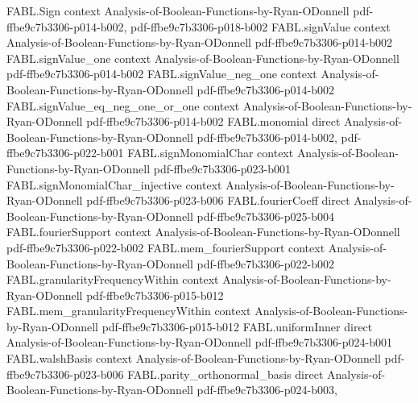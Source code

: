 \begin{theorem}
\label{FABL.bentkusWhitening_norm_sameSigns_le}
\leanok
{}
\proofstep
  {FABL.Sign}
  {context}
  {Analysis-of-Boolean-Functions-by-Ryan-ODonnell}
  {pdf-ffbe9c7b3306-p014-b002,
    pdf-ffbe9c7b3306-p018-b002}
\proofstep
  {FABL.signValue}
  {context}
  {Analysis-of-Boolean-Functions-by-Ryan-ODonnell}
  {pdf-ffbe9c7b3306-p014-b002}
\proofstep
  {FABL.signValue_one}
  {context}
  {Analysis-of-Boolean-Functions-by-Ryan-ODonnell}
  {pdf-ffbe9c7b3306-p014-b002}
\proofstep
  {FABL.signValue_neg_one}
  {context}
  {Analysis-of-Boolean-Functions-by-Ryan-ODonnell}
  {pdf-ffbe9c7b3306-p014-b002}
\proofstep
  {FABL.signValue_eq_neg_one_or_one}
  {context}
  {Analysis-of-Boolean-Functions-by-Ryan-ODonnell}
  {pdf-ffbe9c7b3306-p014-b002}
\proofstep
  {FABL.monomial}
  {direct}
  {Analysis-of-Boolean-Functions-by-Ryan-ODonnell}
  {pdf-ffbe9c7b3306-p014-b002,
    pdf-ffbe9c7b3306-p022-b001}
\proofstep
  {FABL.signMonomialChar}
  {context}
  {Analysis-of-Boolean-Functions-by-Ryan-ODonnell}
  {pdf-ffbe9c7b3306-p023-b001}
\proofstep
  {FABL.signMonomialChar_injective}
  {context}
  {Analysis-of-Boolean-Functions-by-Ryan-ODonnell}
  {pdf-ffbe9c7b3306-p023-b006}
\proofstep
  {FABL.fourierCoeff}
  {direct}
  {Analysis-of-Boolean-Functions-by-Ryan-ODonnell}
  {pdf-ffbe9c7b3306-p025-b004}
\proofstep
  {FABL.fourierSupport}
  {context}
  {Analysis-of-Boolean-Functions-by-Ryan-ODonnell}
  {pdf-ffbe9c7b3306-p022-b002}
\proofstep
  {FABL.mem_fourierSupport}
  {context}
  {Analysis-of-Boolean-Functions-by-Ryan-ODonnell}
  {pdf-ffbe9c7b3306-p022-b002}
\proofstep
  {FABL.granularityFrequencyWithin}
  {context}
  {Analysis-of-Boolean-Functions-by-Ryan-ODonnell}
  {pdf-ffbe9c7b3306-p015-b012}
\proofstep
  {FABL.mem_granularityFrequencyWithin}
  {context}
  {Analysis-of-Boolean-Functions-by-Ryan-ODonnell}
  {pdf-ffbe9c7b3306-p015-b012}
\proofstep
  {FABL.uniformInner}
  {direct}
  {Analysis-of-Boolean-Functions-by-Ryan-ODonnell}
  {pdf-ffbe9c7b3306-p024-b001}
\proofstep
  {FABL.walshBasis}
  {context}
  {Analysis-of-Boolean-Functions-by-Ryan-ODonnell}
  {pdf-ffbe9c7b3306-p023-b006}
\proofstep
  {FABL.parity_orthonormal_basis}
  {direct}
  {Analysis-of-Boolean-Functions-by-Ryan-ODonnell}
  {pdf-ffbe9c7b3306-p024-b003,
}
\end{theorem}
